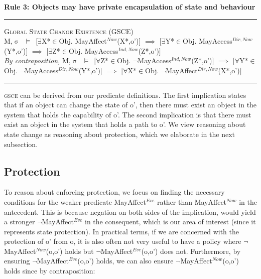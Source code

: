 \documentclass[a4paper,11pt, twoside,twocolumn]{article}
\newenvironment{logic}[1][null]
{\begin{flushleft} \small \label{#1}}
{\end{flushleft}}
\newcommand{\loin}{$\in$}
\newcommand{\loforall}{$\forall$}
\newcommand{\loexists}{$\exists$}
\newcommand{\loimplies}{$\implies$}
\newcommand{\losigma}{$\upsigma$}
\newcommand{\loturns} {$\vDash$}
\newcommand{\loneg}{$\boldsymbol \neg$}
\newcommand{\ablock} {\null\qquad}
\begin{document}
\textbf{Rule 3: Objects may have private encapsulation of state and behaviour}
\begin{logic}
\hrule\null
\textsc{\normalsize *Global State Change Existence (GSCE)}\\
M,\losigma\ \loturns\ $[$\loexists X*\loin{Obj}. MayAffect$^{Now}$(X*,o')$]$\linebreak
\ablock \loimplies \linebreak
\ablock $[$\loexists Y*\loin{Obj}. MayAccess$^{Dir,Now}$(Y*,o')$]$\linebreak
\ablock \loimplies \linebreak
\ablock $[$\loexists Z*\loin{Obj}. MayAccess$^{Ind,Now}$(Z*,o')$]$
\linebreak\\
\textit{By contraposition,}\linebreak
M,\losigma\ \loturns\ $[$\loforall Z*\loin{Obj}. \loneg MayAccess$^{Ind,Now}$(Z*,o')$]$\linebreak
\ablock \loimplies\linebreak
\ablock $[$\loforall Y*\loin{Obj}. \loneg MayAccess$^{Dir,Now}$(Y*,o')$]$\linebreak
\ablock \loimplies\linebreak
\ablock $[$\loforall X*\loin{Obj}. \loneg MayAffect$^{Dir,Now}$(X*,o')$]$\linebreak
\hrule
\end{logic}
\textsc{gsce} can be derived from our predicate definitions. The first implication states that if an object can change the state of o', then there must exist an object in the system that holds the capability of o'. The second implication is that there must exist an object in the system that holds a path to o'.
We view reasoning about state change as reasoning about protection, which we elaborate in the next subsection.
\subsection{Protection}\label{protection}
To reason about enforcing protection, we focus on finding the necessary conditions for the weaker predicate MayAffect$^{Eve}$ rather than MayAffect$^{Now}$ in the antecedent. This is because negation on both sides of the implication, would yield a stronger \loneg MayAffect$^{Eve}$ in the consequent, which is our area of interest (since it represents state protection). In practical terms, if we are concerned with the protection of o' from o, it is also often not very useful to have a policy where \loneg MayAffect$^{Now}$(o,o') holds but \loneg MayAffect$^{Eve}$(o,o') does not. Furthermore, by ensuring \loneg MayAffect$^{Eve}$(o,o') holds, we can also ensure \loneg MayAffect$^{Now}$(o,o') holds since by contraposition:
\end{document}
